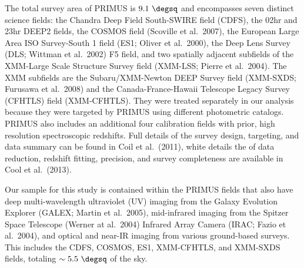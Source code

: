 The total survey area of PRIMUS is $9.1~\degsq$ and encompasses seven distinct science fields: the Chandra Deep Field South-SWIRE field (CDFS), the 02hr and 23hr DEEP2 fields, the COSMOS field (Scoville et al.~2007), the European Large Area ISO Survey-South 1 field (ES1; Oliver et al.~2000), the Deep Lens Survey (DLS; Wittman et al.~2002) F5 field, and two spatially adjacent subfields of the XMM-Large Scale Structure Survey field (XMM-LSS; Pierre et al.~2004). The XMM subfields are the Subaru/XMM-Newton DEEP Survey field (XMM-SXDS; Furusawa et al.~2008) and the Canada-France-Hawaii Telescope Legacy Survey (CFHTLS) field (XMM-CFHTLS).
They were treated separately in our analysis because they were targeted by PRIMUS using different photometric catalogs.
PRIMUS also includes an additional four calibration fields with prior, high resolution spectroscopic redshifts.
Full details of the survey design, targeting, and data summary can be found in Coil et al.~(2011), white details the of data reduction, redshift fitting, precision, and survey completeness are available in Cool et al.~(2013).

Our sample for this study is contained within the PRIMUS fields that also have deep multi-wavelength ultraviolet (UV) imaging from the Galaxy Evolution Explorer (GALEX; Martin et al.~2005), mid-infrared imaging from the Spitzer Space Telescope (Werner at al.~2004) Infrared Array Camera (IRAC; Fazio et al.~2004), and optical and near-IR imaging from various ground-based surveys.
This includes the CDFS, COSMOS, ES1, XMM-CFHTLS, and XMM-SXDS fields, totaling ${\sim 5.5~\degsq}$ of the sky.


